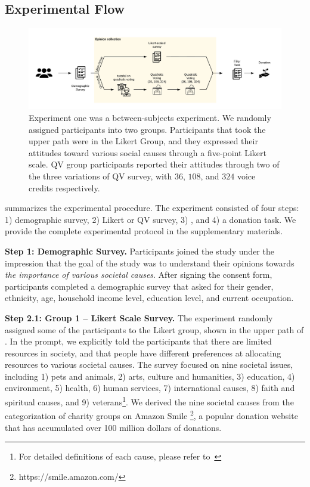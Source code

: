 \subsection{Experimental Flow}
\begin{figure}[htpb]
    \centering
    \includegraphics[width=\textwidth, keepaspectratio=true]{content/image/exp1_flow.pdf}
    \caption{
        Experiment one was a between-subjects experiment. We randomly assigned participants into two groups. Participants that took the upper path were in the Likert Group, and they expressed their attitudes toward various social causes through a five-point Likert scale. QV group participants reported their attitudes through two of the three variations of QV survey, with $36$, $108$, and $324$ voice credits respectively.
    }
    \label{fig:exp1_image_flow}
\end{figure}

 summarizes the experimental procedure. The experiment consisted of four steps: 1) demographic survey, 2) Likert or QV survey, 3) {}, and 4) a donation task. We provide the complete experimental protocol in the supplementary materials.

\textbf{Step 1: Demographic Survey.} Participants joined the study under the impression that the goal of the study was to understand their opinions towards \textit{the importance of various societal causes}. After signing the consent form, participants completed a demographic survey that asked for their gender, ethnicity, age, household income level, education level, and current occupation.

\textbf{Step 2.1: Group 1 -- Likert Scale Survey.} The experiment randomly assigned some of the participants to the Likert group, shown in the upper path of . In the prompt, we explicitly told the participants that there are limited resources in society, and that people have different preferences at allocating resources to various societal causes. The survey focused on nine societal issues, including 1) pets and animals, 2) arts, culture and humanities, 3) education, 4) environment, 5) health, 6) human services, 7) international causes, 8) faith and spiritual causes, and 9) veterans\footnote{For detailed definitions of each cause, please refer to~}. We derived the nine societal causes from the categorization of charity groups on Amazon Smile \footnote{https://smile.amazon.com/}, a popular donation website that has accumulated over 100 million dollars of donations.

